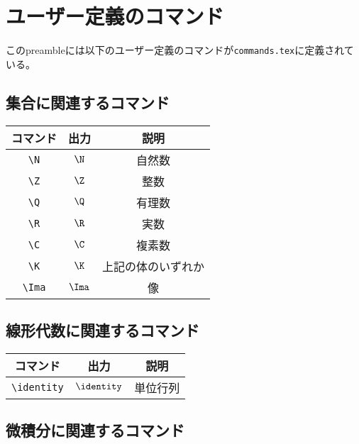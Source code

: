 \chapter{ユーザー定義のコマンド}

このpreambleには以下のユーザー定義のコマンドが\verb|commands.tex|に定義されている。

\section{集合に関連するコマンド}

\begin{longtable}{ccc}
    \toprule
    コマンド    & 出力     & 説明               \\
    \midrule
    \verb|\N|   & \(\N\)   & 自然数             \\
    \verb|\Z|   & \(\Z\)   & 整数               \\
    \verb|\Q|   & \(\Q\)   & 有理数             \\
    \verb|\R|   & \(\R\)   & 実数               \\
    \verb|\C|   & \(\C\)   & 複素数             \\
    \verb|\K|   & \(\K\)   & 上記の体のいずれか \\
    \verb|\Ima| & \(\Ima\) & 像                 \\
    \bottomrule
\end{longtable}

\section{線形代数に関連するコマンド}

\begin{longtable}{ccc}
    \toprule
    コマンド         & 出力          & 説明     \\
    \midrule
    \verb|\identity| & \(\identity\) & 単位行列 \\
    \bottomrule
\end{longtable}

\section{微積分に関連するコマンド}


